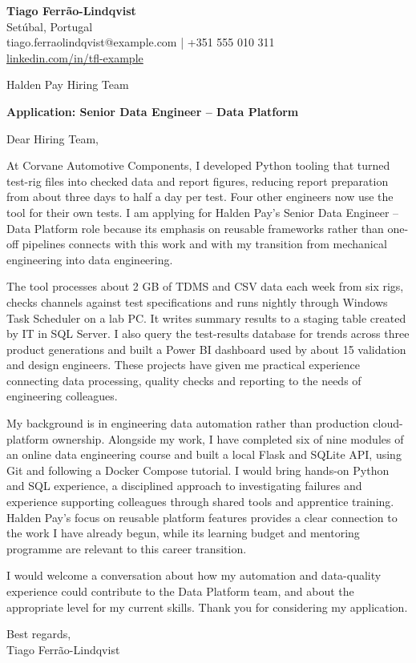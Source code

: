 \documentclass[11pt,a4paper]{article}
\begin{document}
{\Large\bfseries\color{primarycolor} Tiago Ferrão-Lindqvist}\\
Setúbal, Portugal\\
tiago.ferraolindqvist@example.com | +351 555 010 311\\
\href{https://linkedin.com/in/tfl-example}{linkedin.com/in/tfl-example}

Halden Pay Hiring Team

\textbf{Application: Senior Data Engineer – Data Platform}

Dear Hiring Team,

At Corvane Automotive Components, I developed Python tooling that turned test-rig files into checked data and report figures, reducing report preparation from about three days to half a day per test. Four other engineers now use the tool for their own tests. I am applying for Halden Pay's Senior Data Engineer – Data Platform role because its emphasis on reusable frameworks rather than one-off pipelines connects with this work and with my transition from mechanical engineering into data engineering.

The tool processes about 2 GB of TDMS and CSV data each week from six rigs, checks channels against test specifications and runs nightly through Windows Task Scheduler on a lab PC. It writes summary results to a staging table created by IT in SQL Server. I also query the test-results database for trends across three product generations and built a Power BI dashboard used by about 15 validation and design engineers. These projects have given me practical experience connecting data processing, quality checks and reporting to the needs of engineering colleagues.

My background is in engineering data automation rather than production cloud-platform ownership. Alongside my work, I have completed six of nine modules of an online data engineering course and built a local Flask and SQLite API, using Git and following a Docker Compose tutorial. I would bring hands-on Python and SQL experience, a disciplined approach to investigating failures and experience supporting colleagues through shared tools and apprentice training. Halden Pay's focus on reusable platform features provides a clear connection to the work I have already begun, while its learning budget and mentoring programme are relevant to this career transition.

I would welcome a conversation about how my automation and data-quality experience could contribute to the Data Platform team, and about the appropriate level for my current skills. Thank you for considering my application.

Best regards,\\
Tiago Ferrão-Lindqvist
\end{document}
